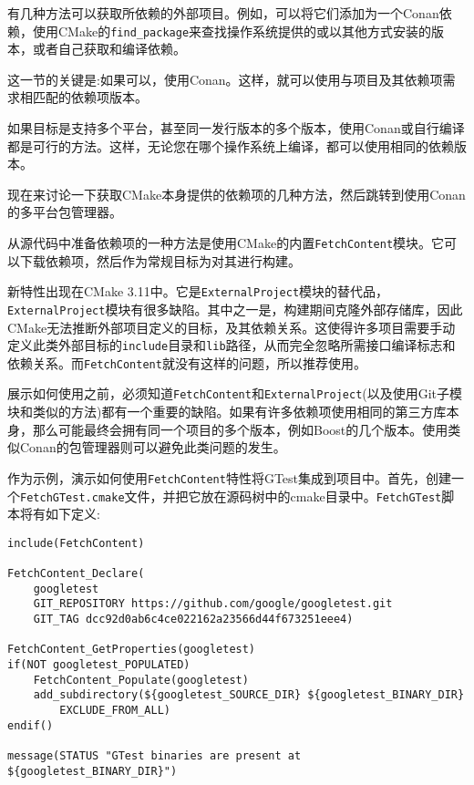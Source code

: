 
有几种方法可以获取所依赖的外部项目。例如，可以将它们添加为一个Conan依赖，使用CMake的\texttt{find\_package}来查找操作系统提供的或以其他方式安装的版本，或者自己获取和编译依赖。

这一节的关键是:如果可以，使用Conan。这样，就可以使用与项目及其依赖项需求相匹配的依赖项版本。

如果目标是支持多个平台，甚至同一发行版本的多个版本，使用Conan或自行编译都是可行的方法。这样，无论您在哪个操作系统上编译，都可以使用相同的依赖版本。

现在来讨论一下获取CMake本身提供的依赖项的几种方法，然后跳转到使用Conan的多平台包管理器。


从源代码中准备依赖项的一种方法是使用CMake的内置\texttt{FetchContent}模块。它可以下载依赖项，然后作为常规目标为对其进行构建。

新特性出现在CMake 3.11中。它是\texttt{ExternalProject}模块的替代品，\texttt{ExternalProject}模块有很多缺陷。其中之一是，构建期间克隆外部存储库，因此CMake无法推断外部项目定义的目标，及其依赖关系。这使得许多项目需要手动定义此类外部目标的\texttt{include}目录和\texttt{lib}路径，从而完全忽略所需接口编译标志和依赖关系。而\texttt{FetchContent}就没有这样的问题，所以推荐使用。

\begin{tcolorbox}[colback=blue!5!white,colframe=blue!75!black, title=Note]
\hspace*{0.7cm}展示如何使用之前，必须知道\texttt{FetchContent}和\texttt{ExternalProject}(以及使用Git子模块和类似的方法)都有一个重要的缺陷。如果有许多依赖项使用相同的第三方库本身，那么可能最终会拥有同一个项目的多个版本，例如Boost的几个版本。使用类似Conan的包管理器则可以避免此类问题的发生。
\end{tcolorbox}

作为示例，演示如何使用\texttt{FetchContent}特性将GTest集成到项目中。首先，创建一个\texttt{FetchGTest.cmake}文件，并把它放在源码树中的cmake目录中。\texttt{FetchGTest}脚本将有如下定义:

\begin{lstlisting}[style=styleCMake]
include(FetchContent)

FetchContent_Declare(
	googletest
	GIT_REPOSITORY https://github.com/google/googletest.git
	GIT_TAG dcc92d0ab6c4ce022162a23566d44f673251eee4)

FetchContent_GetProperties(googletest)
if(NOT googletest_POPULATED)
	FetchContent_Populate(googletest)
	add_subdirectory(${googletest_SOURCE_DIR} ${googletest_BINARY_DIR}
		EXCLUDE_FROM_ALL)
endif()

message(STATUS "GTest binaries are present at ${googletest_BINARY_DIR}")
\end{lstlisting}

